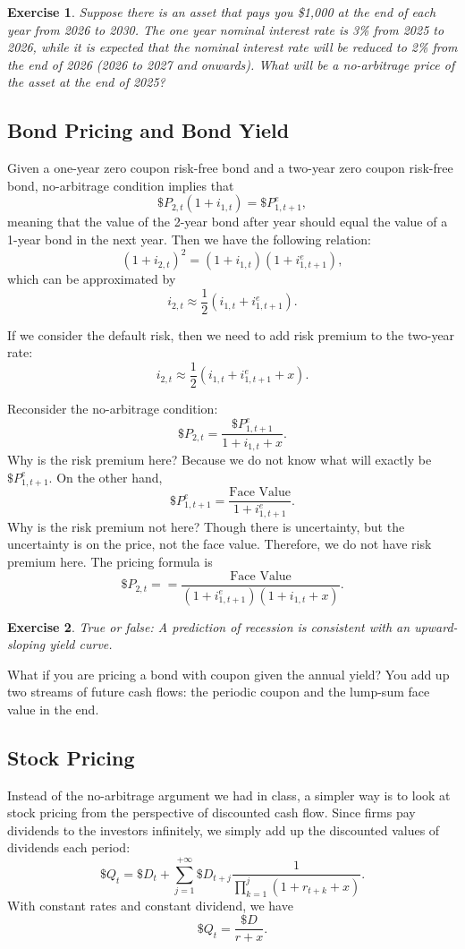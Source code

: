 \documentclass[12pt]{article}
\newtheorem{exercise}{Exercise}
\begin{document}
\begin{exercise}
    Suppose there is an asset that pays you \$1,000 at the end of each year from 2026 to 2030. The one year nominal interest rate is 3\% from 2025 to 2026, while it is expected that the nominal interest rate will be reduced to 2\% from the end of 2026 (2026 to 2027 and onwards). What will be a no-arbitrage price of the asset at the end of 2025?
\end{exercise}

\subsection*{Bond Pricing and Bond Yield}
Given a one-year zero coupon risk-free bond and a two-year zero coupon risk-free bond, no-arbitrage condition implies that
\[\$P_{2,t} (1 + i_{1,t}) = \$P_{1, t+1}^e,\]
meaning that the value of the 2-year bond after year should equal the value of a 1-year bond in the next year. Then we have the following relation:
\[(1 + i_{2,t})^2 = (1 + i_{1,t})(1 + i_{1, t+1}^e),\]
which can be approximated by
\[ i_{2,t} \approx \frac{1}{2}(i_{1,t} + i_{1, t+1}^e).\]

If we consider the default risk, then we need to add risk premium to the two-year rate:
\[ i_{2,t} \approx \frac{1}{2}(i_{1,t} + i_{1, t+1}^e + x).\]

Reconsider the no-arbitrage condition:
\[\$ P_{2,t} = \frac{\$ P_{1, t+1}^e}{1 + i_{1,t} + x}.\]
Why is the risk premium here? Because we do not know what will exactly be $\$ P_{1, t+1}^e$. On the other hand,
\[\$ P_{1,t+1}^e = \frac{\text{Face Value}}{1 + i_{1,t+1}^e}.\]
Why is the risk premium not here? Though there is uncertainty, but the uncertainty is on the price, not the face value. Therefore, we do not have risk premium here. The pricing formula is
\[ \$ P_{2,t} = = \frac{\text{Face Value}}{(1 + i_{1,t+1}^e)(1 + i_{1,t} + x)}.\]

\begin{exercise}
    True or false: A prediction of recession is consistent with an upward-sloping yield curve.
\end{exercise}

What if you are pricing a bond with coupon given the annual yield? You add up two streams of future cash flows: the periodic coupon and the lump-sum face value in the end.

\subsection*{Stock Pricing}
Instead of the no-arbitrage argument we had in class, a simpler way is to look at stock pricing from the perspective of discounted cash flow. Since firms pay dividends to the investors infinitely, we simply add up the discounted values of dividends each period:
\[ \$Q_t = \$D_t + \sum_{j=1}^{+\infty} \$D_{t+j} \frac{1}{\prod_{k=1}^j(1+r_{t+k} + x)}. \]
With constant rates and constant dividend, we have
\[ \$Q_t = \frac{\$D}{r+x}. \]
\end{document}
